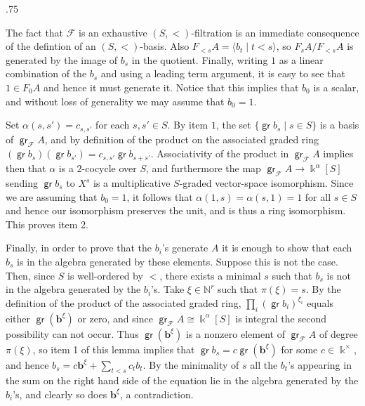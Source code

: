 \documentclass[11pt,fleqn]{article}
\makeatletter
\renewenvironment{proof}[1][\textit{Proof}]{\par
  \pushQED{\qed}%
  \normalfont \topsep.75\paraskip\relax
  \trivlist
  \item[\hskip\labelsep
        \itshape
    #1\@addpunct{.}]\ignorespaces
}{%
  \popQED\endtrivlist\@endpefalse
}
\newcommand\NN{\mathbb N}
\renewcommand\to{\longrightarrow}
\newcommand\F{\mathcal F}
\renewcommand\b{\mathbf b}
\renewcommand\k{\Bbbk}
\DeclareMathOperator\gr{\mathsf{gr}}
\makeatother
\begin{document}
\begin{proof}
The fact that $\F$ is an exhaustive $(S,<)$-filtration is an immediate consequence of the 
defintion of an $(S,<)$-basis. Also $F_{<s}A = \langle b_t \mid t < s\rangle$, so $F_sA / 
F_{<s}A$ is generated
by the image of $b_s$ in the quotient. Finally, writing $1$ as a linear combination of the $b_s$
and using a leading term argument, it is easy to see that $1 \in F_0A$ and hence it must generate
it. Notice that this implies that $b_0$ is a scalar, and without loss of generality we may assume
that $b_0 = 1$.

Set $\alpha(s,s') = c_{s,s'}$ for each $s,s' \in S$. By item $1$, the set $\{\gr b_s \mid s \in 
S\}$ is a basis of $\gr_\F A$, and by definition of the product on the associated graded ring
$(\gr b_s) (\gr b_{s'}) = c_{s,s'} \gr b_{s+s'}$. Associativity of the product in $\gr_\F A$
implies then that $\alpha$ is a $2$-cocycle over $S$, and furthermore the map $\gr_\F A \to 
\k^\alpha[S]$ sending $\gr b_s$ to $X^s$ is a multiplicative $S$-graded vector-space isomorphism.
Since we are assuming that $b_0 = 1$, it follows that $\alpha(1,s) = \alpha(s,1) = 1$ for all 
$s \in S$ and hence our isomorphism preserves the unit, and is thus a ring isomorphism.
This proves item 2.

Finally, in order to prove that the $b_i$'s generate $A$ it is enough to show that each $b_s$
is in the algebra generated by these elements. Suppose this is not the case. Then, since $S$ is 
well-ordered by $<$, there exists a minimal $s$ such that $b_s$ is not in the algebra
generated by the $b_i$'s. Take $\xi \in \NN^r$ such that $\pi(\xi) = s$. By the definition of 
the product of the associated graded ring, $\prod_i(\gr b_i)^{\xi_i}$ equals either $\gr 
(\b^\xi)$ or zero, and since $\gr_\F A \cong \k^\alpha[S]$ is integral the second possibility 
can not occur. Thus $\gr(\b^\xi)$ is a nonzero element of $\gr_\F A$ of degree $\pi(\xi)$,
so item 1 of this lemma implies that $\gr b_s = c\gr(\b^\xi)$ for some $c \in \k^\times$, and 
hence $b_s  = c\b^\xi + \sum_{t<s} c_t b_t$. By the minimality of $s$ all the $b_t$'s appearing
in the sum on the right hand side of the equation lie in the algebra generated by the $b_i$'s,
and clearly so does $\b^\xi$, a contradiction. 
\end{proof}
\end{document}
